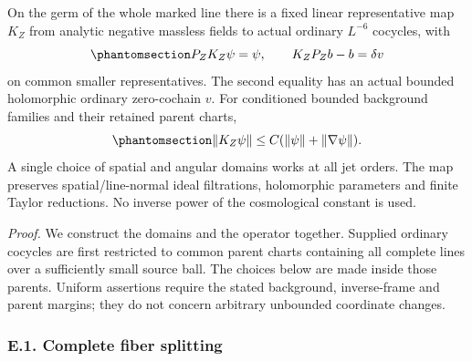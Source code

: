 \documentclass[
  english,
  11pt,
  reqno]{amsart}
\begin{document}
On the germ of the whole marked line there is a fixed linear
representative map \(K_Z\) from analytic negative massless fields to
actual ordinary \(L^{-6}\) cocycles, with
\begin{equation}\protect\phantomsection\label{eq:gg-curved-penrose-actual-inverses}{
 P_ZK_Z\psi=\psi,\qquad
 K_ZP_Zb-b=\delta v
}\end{equation} on common smaller representatives. The second equality
has an actual bounded holomorphic ordinary zero-cochain \(v\). For
conditioned bounded background families and their retained parent
charts,
\begin{equation}\protect\phantomsection\label{eq:gg-curved-penrose-representative-bound}{
 \|K_Z\psi\|\le C(\|\psi\|+\|\nabla\psi\|).
}\end{equation} A single choice of spatial and angular domains works at
all jet orders. The map preserves spatial/line-normal ideal filtrations,
holomorphic parameters and finite Taylor reductions. No inverse power of
the cosmological constant is used.

\emph{Proof.} We construct the domains and the operator together.
Supplied ordinary cocycles are first restricted to common parent charts
containing all complete lines over a sufficiently small source ball. The
choices below are made inside those parents. Uniform assertions require
the stated background, inverse-frame and parent margins; they do not
concern arbitrary unbounded coordinate changes.

\protect{}\label{sec:gg-penrose-complete-fiber-splitting}

\subsubsection{E.1. Complete fiber
splitting}\label{e.1.-complete-fiber-splitting}
\end{document}

